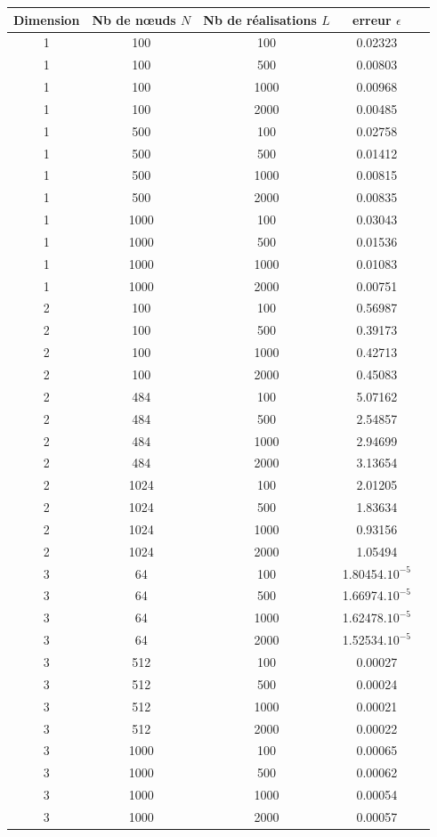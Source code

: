 \begin{table}[htbp]
  \centering
\begin{tabular}{|c |c |c |c |c |}
\hline
Dimension & Nb de n\oe uds $N$  & Nb de réalisations $L$ & erreur $\epsilon$ \\
\hline
1 & 100 & 100 & 0.02323   \\
\hline
1 & 100 & 500 & 0.00803    \\
\hline
1 & 100 & 1000 & 0.00968    \\
\hline
1 & 100 & 2000 & 0.00485    \\
\hline
\hline
1 & 500 & 100 & 0.02758    \\
\hline
1 & 500 & 500 & 0.01412  \\
\hline
1 & 500 & 1000 & 0.00815    \\
\hline
1 & 500 & 2000 & 0.00835    \\
\hline
\hline
1 & 1000 & 100 & 0.03043    \\
\hline
1 & 1000 & 500 & 0.01536    \\
\hline
1 & 1000 & 1000 & 0.01083   \\
\hline
1 & 1000 & 2000 & 0.00751    \\
\hline
\hline
\hline
2 & 100 & 100 & 0.56987   \\
\hline
2 & 100 & 500 & 0.39173    \\
\hline
2 & 100 & 1000 & 0.42713    \\
\hline
2 & 100 & 2000 & 0.45083    \\
\hline
\hline
2 & 484 & 100 & 5.07162    \\
\hline
2 & 484 & 500 & 2.54857   \\
\hline
2 & 484 & 1000 & 2.94699    \\
\hline
2 & 484 & 2000 & 3.13654  \\
\hline
\hline
2 & 1024 & 100 & 2.01205    \\
\hline
2 & 1024 & 500 & 1.83634    \\
\hline
2 & 1024 & 1000 & 0.93156    \\
\hline
2 & 1024 & 2000 & 1.05494    \\
\hline
\hline
\hline
3 & 64 & 100 & 1.80454.$10^{-5}$   \\
\hline
3 & 64 & 500 & 1.66974.$10^{-5}$    \\
\hline
3 & 64 & 1000 & 1.62478.$10^{-5}$    \\
\hline
3 & 64 & 2000 & 1.52534.$10^{-5}$    \\
\hline
\hline
3 & 512 & 100 & 0.00027    \\
\hline
3 & 512 & 500 & 0.00024   \\
\hline
3 & 512 & 1000 & 0.00021    \\
\hline
3 & 512 & 2000 & 0.00022    \\
\hline
\hline
3 & 1000 & 100 & 0.00065    \\
\hline
3 & 1000 & 500 & 0.00062    \\
\hline
3 & 1000 & 1000 & 0.00054    \\
\hline
3 & 1000 & 2000 & 0.00057    \\
\hline
\end{tabular}
\end{table}
\newpage


